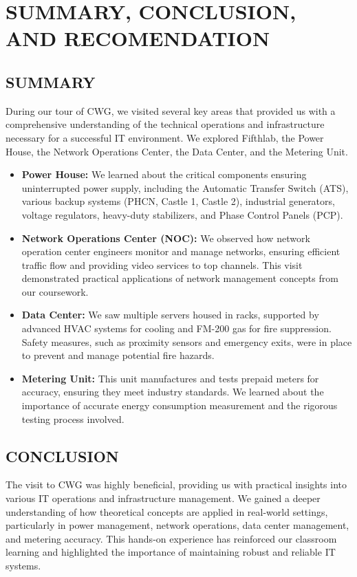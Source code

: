 \documentclass[a4paper,12pt]{report}
\begin{document}
\chapter[Summary, Conclusion, Recommendation]{SUMMARY, CONCLUSION, AND RECOMENDATION}

\section[Summary]{SUMMARY}
During our tour of CWG, we visited several key areas that provided us with a comprehensive understanding of the technical operations and infrastructure necessary for a successful IT environment. We explored Fifthlab, the Power House, the Network Operations Center, the Data Center, and the Metering Unit.

\begin{itemize}
    \item \textbf{Power House:} We learned about the critical components ensuring uninterrupted power supply, including the Automatic Transfer Switch (ATS), various backup systems (PHCN, Castle 1, Castle 2), industrial generators, voltage regulators, heavy-duty stabilizers, and Phase Control Panels (PCP).
    \item \textbf{Network Operations Center (NOC):} We observed how network operation center engineers monitor and manage networks, ensuring efficient traffic flow and providing video services to top channels. This visit demonstrated practical applications of network management concepts from our coursework.
    \item \textbf{Data Center:} We saw multiple servers housed in racks, supported by advanced HVAC systems for cooling and FM-200 gas for fire suppression. Safety measures, such as proximity sensors and emergency exits, were in place to prevent and manage potential fire hazards.
    \item \textbf{Metering Unit:} This unit manufactures and tests prepaid meters for accuracy, ensuring they meet industry standards. We learned about the importance of accurate energy consumption measurement and the rigorous testing process involved.
\end{itemize}

\section[Conclusion]{CONCLUSION}
The visit to CWG was highly beneficial, providing us with practical insights into various IT operations and infrastructure management. We gained a deeper understanding of how theoretical concepts are applied in real-world settings, particularly in power management, network operations, data center management, and metering accuracy. This hands-on experience has reinforced our classroom learning and highlighted the importance of maintaining robust and reliable IT systems.
\end{document}
